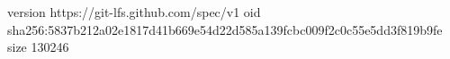 version https://git-lfs.github.com/spec/v1
oid sha256:5837b212a02e1817d41b669e54d22d585a139fcbc009f2c0c55e5dd3f819b9fe
size 130246

